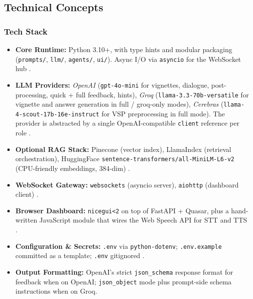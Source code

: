 \documentclass{article}
\begin{document}
\subsection{Technical Concepts}

\subsubsection{Tech Stack}
\begin{itemize}
    \item \textbf{Core Runtime:} Python 3.10+, with type hints and modular packaging (\texttt{prompts/}, \texttt{llm/}, \texttt{agents/}, \texttt{ui/}). Async I/O via \texttt{asyncio} for the WebSocket hub \cite{Topsakal2023CreatingLL}.

    \item \textbf{LLM Providers:} \emph{OpenAI} (\texttt{gpt-4o-mini} for vignettes, dialogue, post-processing, quick + full feedback, hints), \emph{Groq} (\texttt{llama-3.3-70b-versatile} for vignette and answer generation in full / groq-only modes), \emph{Cerebras} (\texttt{llama-4-scout-17b-16e-instruct} for VSP preprocessing in full mode). The provider is abstracted by a single OpenAI-compatible \texttt{client} reference per role \cite{Kulkarni2023TheEO}.

    \item \textbf{Optional RAG Stack:} Pinecone (vector index), LlamaIndex (retrieval orchestration), HuggingFace \texttt{sentence-transformers/all-MiniLM-L6-v2} (CPU-friendly embeddings, 384-dim) \cite{Monir2024VectorSearchED}.

    \item \textbf{WebSocket Gateway:} \texttt{websockets} (asyncio server), \texttt{aiohttp} (dashboard client) \cite{Rygl2017SemanticVE}.

    \item \textbf{Browser Dashboard:} \texttt{nicegui<2} on top of FastAPI + Quasar, plus a hand-written JavaScript module that wires the Web Speech API for STT and TTS \cite{Portovaras2024CurrentTA}.

    \item \textbf{Configuration \& Secrets:} \texttt{.env} via \texttt{python-dotenv}; \texttt{.env.example} committed as a template; \texttt{.env} gitignored \cite{Shen2019ALA}.

    \item \textbf{Output Formatting:} OpenAI's strict \texttt{json\_schema} response format for feedback when on OpenAI; \texttt{json\_object} mode plus prompt-side schema instructions when on Groq.
\end{itemize}
\end{document}
